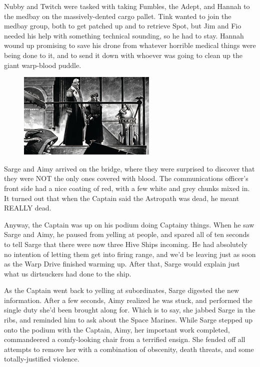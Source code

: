 Nubby and Twitch were tasked with taking Fumbles, the Adept, and Hannah to the medbay on the massively-dented cargo pallet. 
Tink wanted to join the medbay group, both to get patched up and to retrieve Spot, but Jim and Fio needed his help with something technical sounding, so he had to stay. 
Hannah wound up promising to save his drone from whatever horrible medical things were being done to it, and to send it down with whoever was going to clean up the giant warp-blood puddle.
\begin{figure}
	\begin{center}
		\includegraphics[width=\figwidth]{pics/12/71.png}
	\end{center}
\end{figure}
Sarge and Aimy arrived on the bridge, where they were surprised to discover that they were NOT the only ones covered with blood. 
The communications officer's front side had a nice coating of red, with a few white and grey chunks mixed in. 
It turned out that when the Captain said the Astropath was dead, he meant REALLY dead.

Anyway, the Captain was up on his podium doing Captainy things. 
When he saw Sarge and Aimy, he paused from yelling at people, and spared all of ten seconds to tell Sarge that there were now three Hive Ships incoming. 
He had absolutely no intention of letting them get into firing range, and we'd be leaving just as soon as the Warp Drive finished warming up. 
After that, Sarge would explain just what us dirtsuckers had done to the ship.

As the Captain went back to yelling at subordinates, Sarge digested the new information. 
After a few seconds, Aimy realized he was stuck, and performed the single duty she'd been brought along for. 
Which is to say, she jabbed Sarge in the ribs, and reminded him to ask about the Space Marines. 
While Sarge stepped up onto the podium with the Captain, Aimy, her important work completed, commandeered a comfy-looking chair from a terrified ensign. 
She fended off all attempts to remove her with a combination of obscenity, death threats, and some totally-justified violence.

